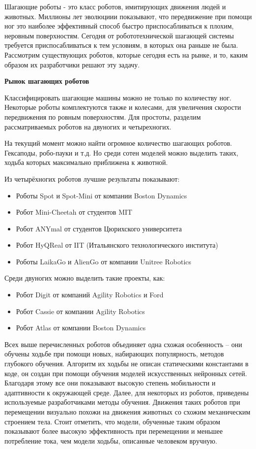 
Шагающие роботы - это класс роботов, имитирующих движения людей и животных. Миллионы лет эволюциии показывают, что передвижение при помощи ног это наиболее эффективный способ быстро приспосабливаться к плохим, неровным поверхностям. Сегодня от робототехнической шагающей системы требуется приспосабливаться к тем условиям, в которых она раньше не была. Рассмотрим существующих роботов, которые сегодня есть на рынке, и то, каким образом их разработчики решают эту задачу.

\textbf{Рынок шагающих роботов}

Классифицировать шагающие машины можно не только по количеству ног. Некоторые роботы комплектуются также и колесами, для увеличения скорости передвижения по ровным поверхностям. Для простоты, разделим рассматриваемых роботов на двуногих и четырехногих. 

На текущий момент можно найти огромное количество шагающих роботов. Гексаподы, робо-пауки и т.д. Но среди сотен моделей можно выделить таких, ходьба которых максимально приближена к животной.

Из четырёхногих роботов лучшие результаты показывают:
\begin{itemize}
    \item Роботы Spot и Spot-Mini от компании Boston Dynamics
    \item Робот Mini-Cheetah от студентов MIT
    \item Робот ANYmal от студентов Цюрихского университета
    \item Робот HyQReal от IIT (Итальянского технологического института)
    \item Роботы LaikaGo и AlienGo от компании Unitree Robotics
\end{itemize}

Среди двуногих можно выделить такие проекты, как:

\begin{itemize}
    \item Робот Digit от компаний Agility Robotics и Ford
    \item Робот Cassie от компании Agility Robotics
    \item Робот Atlas от компании Boston Dynamics
\end{itemize}

Всех выше перечисленных роботов объединяет одна схожая особенность -- они обучены ходьбе при помощи новых, набирающих популярность, методов глубокого обучения. Алгоритм их ходьбы не описан статическими константами в коде, он создан при помощи обучения моделей искусственных нейронных сетей. Благодаря этому все они показывают высокую степень мобильности и адаптивности к окружающей среде. Далее, для некоторых из роботов, приведены используемые разработчиками методы обучения. Движения таких роботов при перемещении визуально похожи на движения животных со схожим механическим строением тела. 
Стоит отметить, что модели, обученные таким образом показывают более высокую эффективность при перемещении \cite{Hwangbo2019} и меньшее потребление тока, чем модели ходьбы, описанные человеком вручную. 

